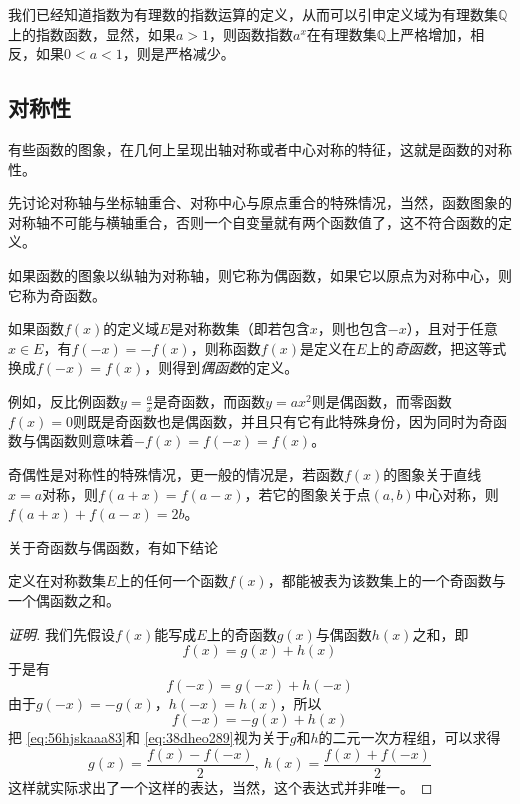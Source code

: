 \begin{example}
  我们已经知道指数为有理数的指数运算的定义，从而可以引申定义域为有理数集$\mathbb{Q}$上的指数函数，显然，如果$a>1$，则函数指数$a^x$在有理数集$\mathbb{Q}$上严格增加，相反，如果$0<a<1$，则是严格减少。
\end{example}

\subsection{对称性}
\label{sec:symmetric-of-function}

有些函数的图象，在几何上呈现出轴对称或者中心对称的特征，这就是函数的对称性。

先讨论对称轴与坐标轴重合、对称中心与原点重合的特殊情况，当然，函数图象的对称轴不可能与横轴重合，否则一个自变量就有两个函数值了，这不符合函数的定义。

如果函数的图象以纵轴为对称轴，则它称为偶函数，如果它以原点为对称中心，则它称为奇函数。
\begin{definition}
  如果函数$f(x)$的定义域$E$是对称数集（即若包含$x$，则也包含$-x$），且对于任意$x \in E$，有$f(-x)=-f(x)$，则称函数$f(x)$是定义在$E$上的\emph{奇函数}，把这等式换成$f(-x)=f(x)$，则得到\emph{偶函数}的定义。
\end{definition}

例如，反比例函数$y=\frac{a}{x}$是奇函数，而函数$y=ax^2$则是偶函数，而零函数$f(x)=0$则既是奇函数也是偶函数，并且只有它有此特殊身份，因为同时为奇函数与偶函数则意味着$-f(x)=f(-x)=f(x)$。

奇偶性是对称性的特殊情况，更一般的情况是，若函数$f(x)$的图象关于直线$x=a$对称，则$f(a+x)=f(a-x)$，若它的图象关于点$(a,b)$中心对称，则$f(a+x)+f(a-x)=2b$。

关于奇函数与偶函数，有如下结论
\begin{theorem}
  定义在对称数集$E$上的任何一个函数$f(x)$，都能被表为该数集上的一个奇函数与一个偶函数之和。
\end{theorem}

\begin{proof}[证明]
  我们先假设$f(x)$能写成$E$上的奇函数$g(x)$与偶函数$h(x)$之和，即
  \begin{equation}
    \label{eq:56hjskaaa83}
   f(x)=g(x)+h(x) 
  \end{equation}
  于是有
  \[ f(-x)=g(-x)+h(-x) \]
  由于$g(-x)=-g(x)$，$h(-x)=h(x)$，所以
  \begin{equation}
    \label{eq:38dheo289}
   f(-x) = -g(x)+h(x) 
  \end{equation}
  把 \autoref{eq:56hjskaaa83}和 \autoref{eq:38dheo289}视为关于$g$和$h$的二元一次方程组，可以求得
  \[ g(x) = \frac{f(x)-f(-x)}{2}, \  h(x) = \frac{f(x)+f(-x)}{2} \]
  这样就实际求出了一个这样的表达，当然，这个表达式并非唯一。
\end{proof}

